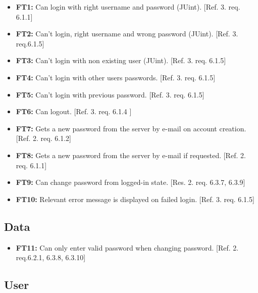 \documentclass{article}
\begin{document}
		\begin{itemize}
  			\item \textbf{FT1:} Can login with right username and password (JUint). [Ref. 3. req. 6.1.1]	
	
			\item \textbf{FT2:} Can't login, right username and wrong password (JUint). [Ref. 3. req.6.1.5]
			
			\item \textbf{FT3:} Can't login with non existing user (JUint). [Ref. 3. req. 6.1.5]
			
			\item \textbf{FT4:} Can't login with other users passwords. [Ref. 3. req. 6.1.5]
			
			\item \textbf{FT5:} Can't login with previous password. [Ref. 3. req. 6.1.5]
				
			\item \textbf{FT6:} Can logout. [Ref. 3. req. 6.1.4 ]

  			\item \textbf{FT7:} Gets a new password from the server by e-mail on account creation. [Ref. 2. req. 6.1.2]
  			
  			\item \textbf{FT8:} Gets a new password from the server by e-mail if requested. [Ref. 2. req. 6.1.1]
  			
  			\item \textbf{FT9:} Can change password from logged-in state. [Res. 2. req. 6.3.7, 6.3.9]

  			\item \textbf{FT10:} Relevant error message is displayed on failed login. [Ref. 3. req. 6.1.5] 
		\end{itemize}
		
		\subsection{Data}
		
		\begin{itemize}
		
  			\item \textbf{FT11:} Can only enter valid password when changing password. [Ref. 2. req.6.2.1, 6.3.8, 6.3.10]

		\end{itemize}
		
		\subsection{User}
		
\end{document}
